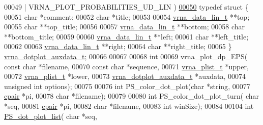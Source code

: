 \begin{DoxyCode}
00049 \textcolor{preprocessor}{                                            | VRNA\_PLOT\_PROBABILITIES\_UD\_LIN )}
\mbox{\hyperlink{structvrna__dotplot__auxdata__t}{00050}} \textcolor{keyword}{typedef} \textcolor{keyword}{struct }\{
00051   \textcolor{keywordtype}{char}            *comment;
00052   \textcolor{keywordtype}{char}            *title;
00053 
00054   \mbox{\hyperlink{group__data__structures_structvrna__data__linear__s}{vrna\_data\_lin\_t}} **top;
00055   \textcolor{keywordtype}{char}            **top\_title;
00056 
00057   \mbox{\hyperlink{group__data__structures_structvrna__data__linear__s}{vrna\_data\_lin\_t}} **bottom;
00058   \textcolor{keywordtype}{char}            **bottom\_title;
00059 
00060   \mbox{\hyperlink{group__data__structures_structvrna__data__linear__s}{vrna\_data\_lin\_t}} **left;
00061   \textcolor{keywordtype}{char}            **left\_title;
00062 
00063   \mbox{\hyperlink{group__data__structures_structvrna__data__linear__s}{vrna\_data\_lin\_t}} **right;
00064   \textcolor{keywordtype}{char}            **right\_title;
00065 \} \mbox{\hyperlink{structvrna__dotplot__auxdata__t}{vrna\_dotplot\_auxdata\_t}};
00066 
00067 
00068 \textcolor{keywordtype}{int}
00069 vrna\_plot\_dp\_EPS( \textcolor{keyword}{const} \textcolor{keywordtype}{char}              *filename,
00070                   \textcolor{keyword}{const} \textcolor{keywordtype}{char}              *sequence,
00071                   \mbox{\hyperlink{group__data__structures_structvrna__plist__s}{vrna\_plist\_t}}            *upper,
00072                   \mbox{\hyperlink{group__data__structures_structvrna__plist__s}{vrna\_plist\_t}}            *lower,
00073                   \mbox{\hyperlink{structvrna__dotplot__auxdata__t}{vrna\_dotplot\_auxdata\_t}}  *auxdata,
00074                   \textcolor{keywordtype}{unsigned} \textcolor{keywordtype}{int}            options);
00075 
00076 \textcolor{keywordtype}{int} PS\_color\_dot\_plot(\textcolor{keywordtype}{char} *\textcolor{keywordtype}{string},
00077                       \mbox{\hyperlink{group__data__structures_structvrna__cpair__s}{cpair}} *pi,
00078                       \textcolor{keywordtype}{char} *filename);
00079 
00080 \textcolor{keywordtype}{int} PS\_color\_dot\_plot\_turn( \textcolor{keywordtype}{char} *seq,
00081                             \mbox{\hyperlink{group__data__structures_structvrna__cpair__s}{cpair}} *pi,
00082                             \textcolor{keywordtype}{char} *filename,
00083                             \textcolor{keywordtype}{int} winSize);
00084 
00104 \textcolor{keywordtype}{int} \mbox{\hyperlink{group__plotting__utils_ga00ea223b5cf02eb2faae5ff29f0d5e12}{PS\_dot\_plot\_list}}( \textcolor{keywordtype}{char} *seq,

\end{DoxyCode}
